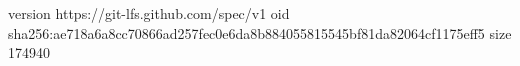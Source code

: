 version https://git-lfs.github.com/spec/v1
oid sha256:ae718a6a8cc70866ad257fec0e6da8b884055815545bf81da82064cf1175eff5
size 174940
